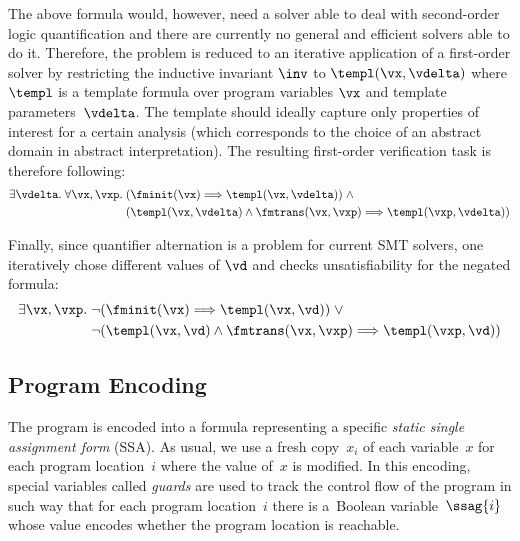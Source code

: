 {The above formula would, however, need a solver able to deal with second-order logic quantification
and there are currently no general and efficient solvers able to do it.
Therefore, the problem is reduced to an iterative application of a first-order solver
by restricting the inductive invariant $\inv$ to $\templ(\vx, \vdelta)$ where $\templ$ is
a template formula over program variables $\vx$ and template parameters~$\vdelta$.
The template should ideally capture only properties of interest for a certain analysis (which corresponds
to the choice of an abstract domain in abstract interpretation).
The resulting first-order verification task is therefore following:
\begin{equation}\label{eq:formula-templates}
\begin{split}
\exists \vdelta . \; \forall \vx, \vxp . \; & 
(\fminit(\vx) \Longrightarrow \templ(\vx, \vdelta)) \; \wedge \\ 
& (\templ(\vx, \vdelta) \wedge \fmtrans(\vx,\vxp) \Longrightarrow 
\templ(\vxp, \vdelta))
\end{split}
\end{equation}

Finally, since quantifier alternation is a problem for current SMT solvers,
one iteratively chose different values of $\vd$ and
checks unsatisfiability for the negated formula:
\begin{equation}\label{eq:templ_neg}
\begin{split}
\exists \vx, \vxp .\; &
    \neg (\fminit(\vx) \Longrightarrow \templ(\vx, \vd)) \; \vee \\
& \neg (\templ(\vx, \vd) \wedge \fmtrans(\vx,\vxp) \Longrightarrow \templ(\vxp, \vd))
\end{split}
\end{equation}

\subsection{Program Encoding}
The program is encoded into a formula representing a specific \emph{static single assignment form} (SSA).
As usual, we use a fresh copy~$x_i$ of each variable~$x$ for each program location~$i$
where the value of~$x$ is modified.
In this encoding, special variables called \emph{guards} are used to track the control flow of the program
in such way that for each program location~$i$ there is a~Boolean variable~$\ssag{i}$ whose value
encodes whether the program location is reachable.

}
